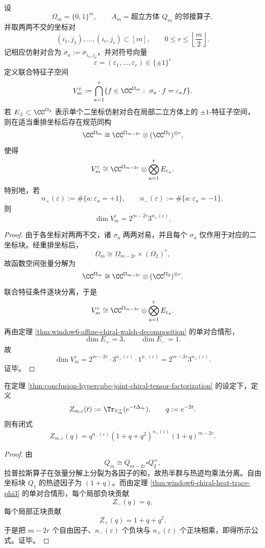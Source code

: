 \begin{theorem}[互不相交仿射对合族的联合手征张量分解]\label{thm:conclusion-hypercube-joint-chiral-tensor-factorization}
设
\[
\Omega_m=\{0,1\}^m,
\qquad
A_m=\text{超立方体 }Q_m\text{ 的邻接算子},
\]
并取两两不交的坐标对
\[
(i_1,j_1),\dots,(i_r,j_r)\subset [m],
\qquad
0\le r\le \left\lfloor\frac m2\right\rfloor.
\]
记相应仿射对合为 \(\sigma_a:=\sigma_{i_a,j_a}\)，并对符号向量
\[
\varepsilon=(\varepsilon_1,\dots,\varepsilon_r)\in\{\pm1\}^r
\]
定义联合特征子空间
\[
V_m^\varepsilon
:=
\bigcap_{a=1}^r
\{f\in \CC^{\Omega_m}:\ \sigma_a\cdot f=\varepsilon_a f\}.
\]
若 \(E_\pm\subset \CC^{\Omega_2}\) 表示单个二坐标仿射对合在局部二立方体上的 \(\pm1\)-特征子空间，则在适当重排坐标后存在规范同构
\[
\CC^{\Omega_m}
\cong
\CC^{\Omega_{m-2r}}\otimes (\CC^{\Omega_2})^{\otimes r},
\]
使得
\[
V_m^\varepsilon
\cong
\CC^{\Omega_{m-2r}}
\otimes
\bigotimes_{a=1}^r E_{\varepsilon_a}.
\]
特别地，若
\[
n_+(\varepsilon):=\#\{a:\varepsilon_a=+1\},
\qquad
n_-(\varepsilon):=\#\{a:\varepsilon_a=-1\},
\]
则
\[
\dim V_m^\varepsilon
=
2^{m-2r}3^{n_+(\varepsilon)}.
\]
\end{theorem}
\begin{proof}
由于各坐标对两两不交，诸 \(\sigma_a\) 两两对易，并且每个 \(\sigma_a\) 仅作用于对应的二坐标块。经重排坐标后，
\[
\Omega_m\cong \Omega_{m-2r}\times (\Omega_2)^r,
\]
故函数空间张量分解为
\[
\CC^{\Omega_m}
\cong
\CC^{\Omega_{m-2r}}\otimes (\CC^{\Omega_2})^{\otimes r}.
\]
联合特征条件逐块分离，于是
\[
V_m^\varepsilon
\cong
\CC^{\Omega_{m-2r}}
\otimes
\bigotimes_{a=1}^r E_{\varepsilon_a}.
\]
再由定理 \ref{thm:window6-affine-chiral-walsh-decomposition} 的单对合情形，
\[
\dim E_+=3,
\qquad
\dim E_-=1.
\]
故
\[
\dim V_m^\varepsilon
=
2^{m-2r}\cdot 3^{n_+(\varepsilon)}\cdot 1^{n_-(\varepsilon)}
=
2^{m-2r}3^{n_+(\varepsilon)}.
\]
证毕。
\end{proof}

\begin{theorem}[联合手征热迹的完全乘积分解]\label{thm:conclusion-hypercube-joint-chiral-heattrace-product}
在定理 \ref{thm:conclusion-hypercube-joint-chiral-tensor-factorization} 的设定下，定义
\[
Z_{m,\varepsilon}(t)
:=
\Tr_{V_m^\varepsilon}(e^{-t\Delta_m}),
\qquad
q:=e^{-2t}.
\]
则有闭式
\[
Z_{m,\varepsilon}(q)
=
q^{n_-(\varepsilon)}(1+q+q^2)^{n_+(\varepsilon)}(1+q)^{m-2r}.
\]
\end{theorem}
\begin{proof}
由
\[
Q_m\cong Q_{m-2r}\square Q_2^{\square r},
\]
拉普拉斯算子在张量分解上分裂为各因子的和，故热半群与热迹均乘法分离。自由坐标块 \(Q_1\) 的热迹因子为 \((1+q)\)。而由定理 \ref{thm:window6-chiral-heat-trace-phi3} 的单对合情形，每个局部负块贡献
\[
Z_-(q)=q,
\]
每个局部正块贡献
\[
Z_+(q)=1+q+q^2.
\]
于是把 \(m-2r\) 个自由因子、\(n_-(\varepsilon)\) 个负块与 \(n_+(\varepsilon)\) 个正块相乘，即得所示公式。证毕。
\end{proof}

